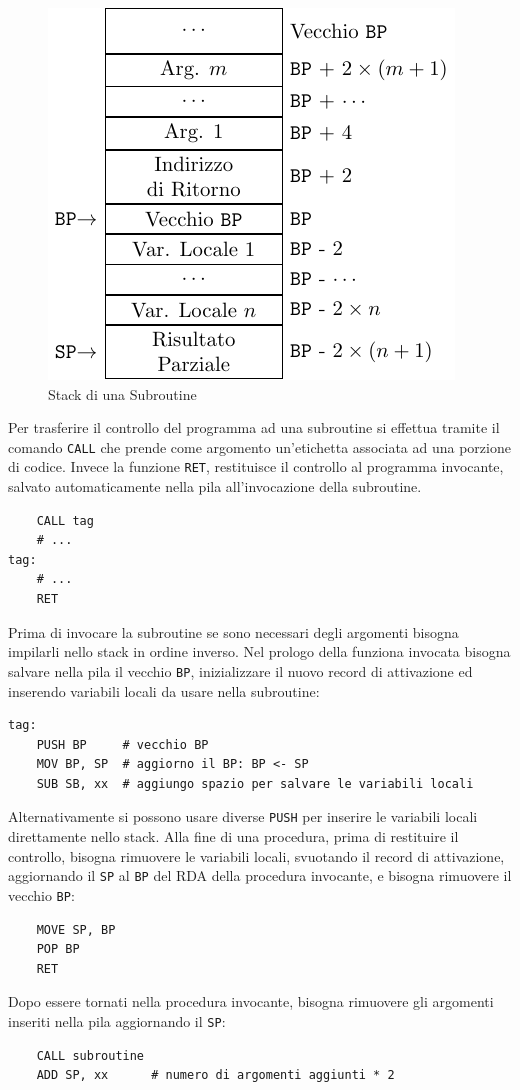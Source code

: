 \documentclass{article}
\numberwithin{equation}{subsection}
\begin{document}
\begin{figure}[H]%
    \centering%
    \includegraphics{rda-subroutine.pdf}%
    \caption{Stack di una Subroutine}%
\end{figure}

Per trasferire il controllo del programma ad una subroutine si effettua tramite il comando \verb|CALL| che prende come argomento un'etichetta associata ad una porzione di 
codice. 
Invece la funzione \verb|RET|, restituisce il controllo al programma invocante, salvato automaticamente nella pila all'invocazione della subroutine. 
\begin{verbatim}
    CALL tag
    # ...
tag: 
    # ...
    RET
\end{verbatim}

Prima di invocare la subroutine se sono necessari degli argomenti bisogna impilarli nello stack in ordine inverso. 
Nel prologo della funziona invocata bisogna salvare nella pila il vecchio \verb|BP|, inizializzare il nuovo record di attivazione ed inserendo variabili locali da usare nella 
subroutine:
\begin{verbatim}
tag:
    PUSH BP     # vecchio BP
    MOV BP, SP  # aggiorno il BP: BP <- SP
    SUB SB, xx  # aggiungo spazio per salvare le variabili locali
\end{verbatim}
Alternativamente si possono usare diverse \verb|PUSH| per inserire le variabili locali direttamente nello stack. Alla fine di una procedura, prima di restituire il controllo, 
bisogna rimuovere le variabili locali, svuotando il record di attivazione, aggiornando il \verb|SP| al \verb|BP| del RDA della procedura invocante, e bisogna rimuovere il vecchio \verb|BP|:
\begin{verbatim}
    MOVE SP, BP
    POP BP
    RET
\end{verbatim}
Dopo essere tornati nella procedura invocante, bisogna rimuovere gli argomenti inseriti nella pila aggiornando il \verb|SP|:
\begin{verbatim}
    CALL subroutine
    ADD SP, xx      # numero di argomenti aggiunti * 2
\end{verbatim}
\end{document}
